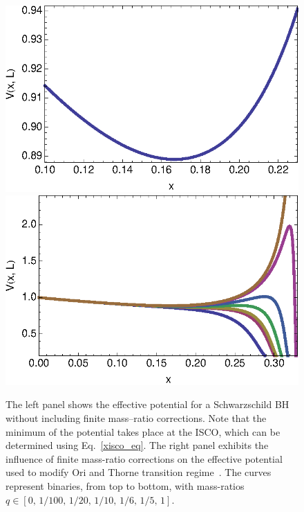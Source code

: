 \begin{figure}%
\includegraphics[height=0.6\textwidth,  clip]{figures/imrimri/pot_eta_limit.eps}
\includegraphics[height=0.6\textwidth,  clip]{figures/imrimri/mod_eff_pot.eps}
\caption{The left panel shows the effective potential for a Schwarzschild BH without including finite mass--ratio corrections. Note that the minimum of the potential takes place at the ISCO, which can be determined using Eq.~\eqref{xisco_eq}.  The right panel exhibits the influence of finite mass-ratio corrections on the effective potential used to modify Ori and Thorne transition regime~\cite{amos}. The curves represent  binaries, from top to bottom, with mass-ratios  \(q \in [0,\, 1/100, \,1/20, \,1/10, \,1/6, \,1/5, \,1 ]\).}
\label{eff_pot_fig}
\end{figure}

